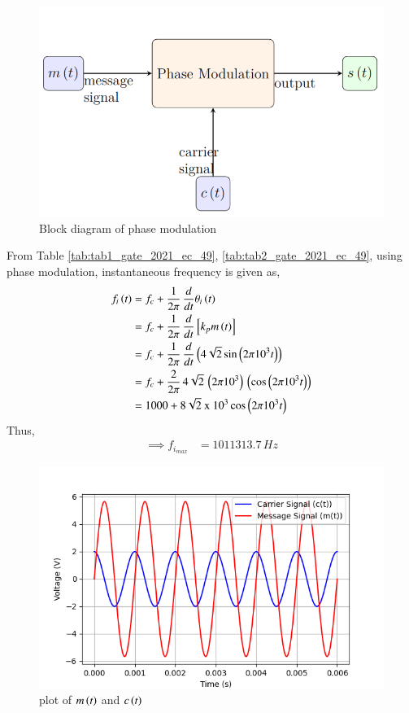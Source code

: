 \documentclass[journal,12pt,twocolumn]{IEEEtran}
\begin{document}
\begin{figure}[ht]
    \centering
    \includegraphics[width=\columnwidth]{figs/fig2.png}
    \caption{Block diagram of phase modulation}
    \label{fig:fig1_gate_2021_ec_49}  
\end{figure}
From Table \ref{tab:tab1_gate_2021_ec_49}, \ref{tab:tab2_gate_2021_ec_49}, using phase modulation, instantaneous frequency is given as,
\begin{align}
    f_i\left(t\right) &= f_c + \frac{1}{2\pi}\, \frac{d}{dt}\theta_i\left(t\right)\\
    &= f_c + \frac{1}{2\pi}\, \frac{d}{dt}{}\left[k_p m\left(t\right)\right]\\
    &= f_c + \frac{1}{2\pi}\, \frac{d}{dt}\left(4\sqrt{2}\sin \left(2 \pi 10^3 t\right)\right)\\
    &= f_c + \frac{2}{2\pi}\, 4\sqrt{2}\, \left(2\pi 10^3\right)\, \left(\cos \left(2 \pi 10^3 t\right)\right)\\
    &= 1000 + 8\sqrt{2} \text{ x } 10^3 \cos \left(2\pi 10^3 t\right)
\end{align}
Thus,
\begin{align}
    \implies f_{i_{max}} &= 1011313.7 \, Hz
\end{align}

\begin{figure}[ht]
    \centering
        \includegraphics[width=\columnwidth]{figs/Figure_1.png}
    \caption{plot of $m\left(t\right)$ and $c\left(t\right)$}
\end{figure}
\end{document}
